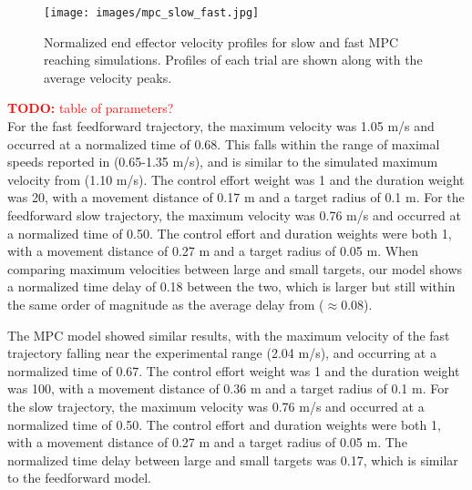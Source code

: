 \documentclass[letterpaper, 10pt, conference]{ieeeconf}
\newcommand{\todo}[1]{\textcolor{red}{\textbf{TODO:} #1}}
\begin{document}
\begin{figure}[h]
    \centering
    \texttt{[image: images/mpc\_slow\_fast.jpg]}
    \caption{Normalized end effector velocity profiles for slow and fast MPC reaching simulations. Profiles of each trial are shown along with the average velocity peaks.}
    \label{fig:VelocityMPC}
\end{figure}

\todo{table of parameters?} \\
For the fast feedforward trajectory, the maximum velocity was 1.05 m/s and occurred at a normalized time of 0.68. This falls within the range of maximal speeds reported in \cite{soechting_target_size} (0.65-1.35 m/s), and is similar to the simulated maximum velocity from \cite{original_paper_high_fidelity} (1.10 m/s). The control effort weight was 1 and the duration weight was 20, with a movement distance of 0.17 m and a target radius of 0.1 m. For the feedforward slow trajectory, the maximum velocity was 0.76 m/s and occurred at a normalized time of 0.50. The control effort and duration weights were both 1, with a movement distance of 0.27 m and a target radius of 0.05 m. 
When comparing maximum velocities between large and small targets, our model shows a normalized time delay of 0.18 between the two, which is larger but still within the same order of magnitude as the average delay from \cite{soechting_target_size} ($\approx 0.08$). 

The MPC model showed similar results, with the maximum velocity of the fast trajectory falling near the experimental range (2.04 m/s), and occurring at a normalized time of 0.67. The control effort weight was 1 and the duration weight was 100, with a movement distance of 0.36 m and a target radius of 0.1 m. For the slow trajectory, the maximum velocity was 0.76 m/s and occurred at a normalized time of 0.50. The control effort and duration weights were both 1, with a movement distance of 0.27 m and a target radius of 0.05 m. 
The normalized time delay between large and small targets was 0.17, which is similar to the feedforward model.
\end{document}
